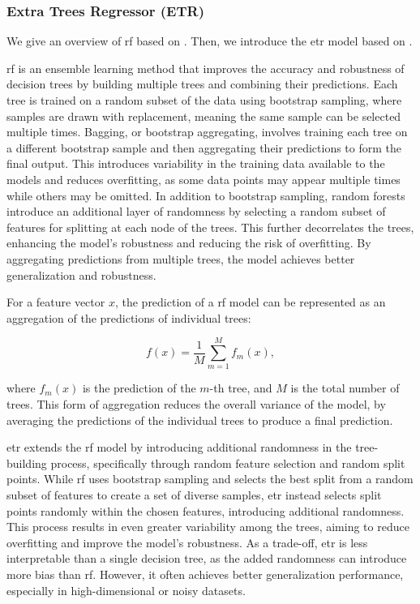 \subsubsection{Extra Trees Regressor (ETR)}
We give an overview of \gls{rf} based on \citet{James2023AnIS}.
Then, we introduce the \gls{etr} model based on \citet{geurtsERF}.

\gls{rf} is an ensemble learning method that improves the accuracy and robustness of decision trees by building multiple trees and combining their predictions.
Each tree is trained on a random subset of the data using bootstrap sampling, where samples are drawn with replacement, meaning the same sample can be selected multiple times.
Bagging, or bootstrap aggregating, involves training each tree on a different bootstrap sample and then aggregating their predictions to form the final output.
This introduces variability in the training data available to the models and reduces overfitting, as some data points may appear multiple times while others may be omitted.
In addition to bootstrap sampling, random forests introduce an additional layer of randomness by selecting a random subset of features for splitting at each node of the trees.
This further decorrelates the trees, enhancing the model's robustness and reducing the risk of overfitting.
By aggregating predictions from multiple trees, the model achieves better generalization and robustness.

For a feature vector $x$, the prediction of a \gls{rf} model can be represented as an aggregation of the predictions of individual trees:

$$
f(x) = \frac{1}{M} \sum_{m=1}^{M} f_m(x),
$$

where $f_m(x)$ is the prediction of the $m$-th tree, and $M$ is the total number of trees.
This form of aggregation reduces the overall variance of the model, by averaging the predictions of the individual trees to produce a final prediction.

\gls{etr} extends the \gls{rf} model by introducing additional randomness in the tree-building process, specifically through random feature selection and random split points.
While \gls{rf} uses bootstrap sampling and selects the best split from a random subset of features to create a set of diverse samples, \gls{etr} instead selects split points randomly within the chosen features, introducing additional randomness.
This process results in even greater variability among the trees, aiming to reduce overfitting and improve the model's robustness.
As a trade-off, \gls{etr} is less interpretable than a single decision tree, as the added randomness can introduce more bias than \gls{rf}.
However, it often achieves better generalization performance, especially in high-dimensional or noisy datasets.